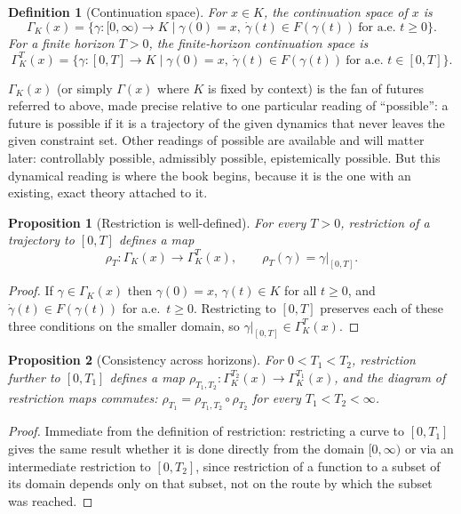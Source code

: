 \documentclass[11pt]{report}
\newtheorem{proposition}{Proposition}[chapter]
\newtheorem{definition}{Definition}[chapter]
\begin{document}
\begin{definition}[Continuation space]
For $x \in K$, the continuation space of $x$ is
\[
\Gamma_K(x) = \{\gamma : [0,\infty) \to K \mid \gamma(0) = x,\ \dot\gamma(t) \in F(\gamma(t))\ \text{for a.e.\ } t \geq 0\}.
\]
For a finite horizon $T > 0$, the finite-horizon continuation space is
\[
\Gamma_K^T(x) = \{\gamma : [0,T] \to K \mid \gamma(0) = x,\ \dot\gamma(t) \in F(\gamma(t))\ \text{for a.e.\ } t \in [0,T]\}.
\]
\end{definition}

$\Gamma_K(x)$ (or simply $\Gamma(x)$ where $K$ is fixed by context) is
the fan of futures referred to above, made precise relative to one
particular reading of ``possible'': a future is possible if it is a
trajectory of the given dynamics that never leaves the given constraint
set. Other readings of possible are available and will matter later:
controllably possible, admissibly possible, epistemically possible. But
this dynamical reading is where the book begins, because it is the one
with an existing, exact theory attached to it.

\begin{proposition}[Restriction is well-defined]
For every $T > 0$, restriction of a trajectory to $[0,T]$ defines a map
\[
\rho_T : \Gamma_K(x) \to \Gamma_K^T(x), \qquad \rho_T(\gamma) = \gamma|_{[0,T]}.
\]
\end{proposition}
\begin{proof}
If $\gamma \in \Gamma_K(x)$ then $\gamma(0) = x$, $\gamma(t) \in K$ for
all $t \geq 0$, and $\dot\gamma(t) \in F(\gamma(t))$ for a.e.\ $t \geq 0$.
Restricting to $[0,T]$ preserves each of these three conditions on the
smaller domain, so $\gamma|_{[0,T]} \in \Gamma_K^T(x)$.
\end{proof}

\begin{proposition}[Consistency across horizons]
For $0 < T_1 < T_2$, restriction further to $[0,T_1]$ defines a map
$\rho_{T_1, T_2} : \Gamma_K^{T_2}(x) \to \Gamma_K^{T_1}(x)$, and the
diagram of restriction maps commutes:
$\rho_{T_1} = \rho_{T_1,T_2} \circ \rho_{T_2}$ for every
$T_1 < T_2 < \infty$.
\end{proposition}
\begin{proof}
Immediate from the definition of restriction: restricting a curve to
$[0,T_1]$ gives the same result whether it is done directly from the
domain $[0,\infty)$ or via an intermediate restriction to $[0,T_2]$,
since restriction of a function to a subset of its domain depends only on
that subset, not on the route by which the subset was reached.
\end{proof}
\end{document}
